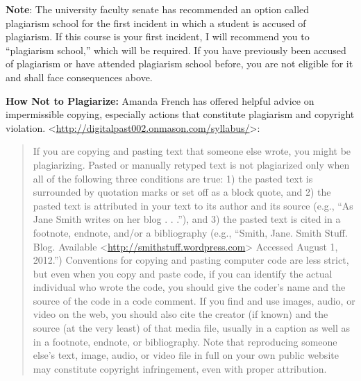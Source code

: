 \documentclass[]{article}
\begin{document}
\textbf{Note}: The university faculty senate has recommended an option
called plagiarism school for the first incident in which a student is
accused of plagiarism. If this course is your first incident, I will
recommend you to ``plagiarism school,'' which will be required. If you
have previously been accused of plagiarism or have attended plagiarism
school before, you are not eligible for it and shall face consequences
above.

\textbf{How Not to Plagiarize: } Amanda French has offered helpful
advice on impermissible copying, especially actions that constitute
plagiarism and copyright violation.
\textless{}\url{http://digitalpast002.onmason.com/syllabus/}\textgreater{}:

\begin{quote}
If you are copying and pasting text that someone else wrote, you might
be plagiarizing. Pasted or manually retyped text is not plagiarized only
when all of the following three conditions are true: 1) the pasted text
is surrounded by quotation marks or set off as a block quote, and 2) the
pasted text is attributed in your text to its author and its source
(e.g., ``As Jane Smith writes on her blog . . .''), and 3) the pasted
text is cited in a footnote, endnote, and/or a bibliography (e.g.,
``Smith, Jane. Smith Stuff. Blog. Available
\textless{}\url{http://smithstuff.wordpress.com}\textgreater{} Accessed
August 1, 2012.'') Conventions for copying and pasting computer code are
less strict, but even when you copy and paste code, if you can identify
the actual individual who wrote the code, you should give the coder's
name and the source of the code in a code comment. If you find and use
images, audio, or video on the web, you should also cite the creator (if
known) and the source (at the very least) of that media file, usually in
a caption as well as in a footnote, endnote, or bibliography. Note that
reproducing someone else's text, image, audio, or video file in full on
your own public website may constitute copyright infringement, even with
proper attribution.
\end{quote}
\end{document}
